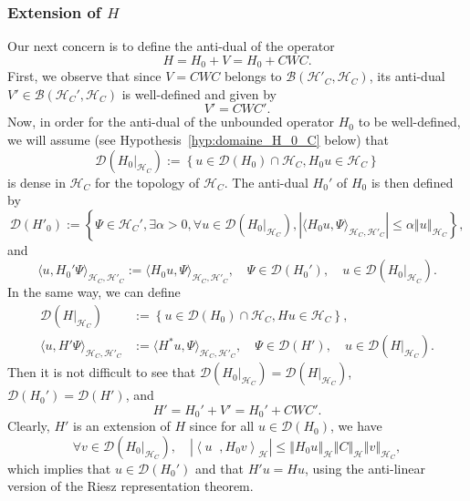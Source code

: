 \documentclass[10pt]{amsart}
\theoremstyle{definition}\newtheorem{defi}[theo]{Definition}\newtheorem{rema}[theo]{Remark}\newtheorem{exam}[theo]{Example}\newtheorem{exem}[theo]{Example}\newtheorem{nota}[theo]{Notation}
\newcommand{\Hi}{\mathcal{H}}
\newcommand{\norme}[1]{\left\Vert #1\right\Vert}
\newcommand{\scal}[2]{\left\langle{#1} \middle., {#2}\right\rangle}
\newcommand{\abso}[1]{\left|{#1}\right|}
\newcommand{\clB}{\mathcal{B}}
\newcommand{\clD}{\mathcal{D}}
\let\oldexists\exists
\renewcommand*{\exists}{\mathrel{\oldexists}}
\let\oldforall\forall
\renewcommand*{\forall}{\mathrel{\oldforall}}
\begin{document}
\subsubsection{Extension of \texorpdfstring{$H$}{H}}
Our next concern is to define the anti-dual of the operator
\begin{equation*}
H=H_0+V=H_0+CWC.
\end{equation*}
First, we observe that since $V=CW C$ belongs to $\clB(\Hi'_C,\Hi_C)$, its anti-dual $V'\in\clB(\Hi_C',\Hi_C)$ is well-defined and given by
\begin{equation*}
V'=CW C'.
\end{equation*}
Now, in order for the anti-dual of the unbounded operator $H_0$ to be well-defined, we will assume (see Hypothesis~\ref{hyp:domaine_H_0_C} below) that
\begin{equation*}
\clD({H_0}|_{\Hi_C}):=\left\lbrace u\in\clD(H_0)\cap\Hi_C, H_0u\in\Hi_C\right\rbrace
\end{equation*}
is dense in $\Hi_C$ for the topology of $\Hi_C$. The anti-dual $H_0'$ of $H_0$ is then defined by
\begin{equation*}
\clD(H'_0):=\left\lbrace \Psi\in\Hi_C',\exists \alpha>0,\forall u\in\clD\left({H_0}|_{\Hi_C}\right),\left|\langle H_0u,\Psi\rangle_{\Hi_C,\Hi'_C}\right|\leq\alpha\norme{u}_{\Hi_C}\right\rbrace,
\end{equation*}
and
\begin{equation*}
\langle u,H_0'\Psi\rangle_{\Hi_C,\Hi'_C}:=\langle H_0u,\Psi\rangle_{\Hi_C,\Hi'_C}, \quad \Psi\in\clD(H_0'), \quad u\in\clD({H_0}|_{\Hi_C}).
\end{equation*}
In the same way, we can define
\begin{align*}
\clD(H|_{\Hi_C}) &{:=}\left\lbrace u\in\clD(H_0)\cap\Hi_C,Hu\in\Hi_C\right\rbrace,
\\
\langle u,H'\Psi \rangle_{\Hi_C,\Hi'_C} &{:=}\langle H^*u,\Psi\rangle_{\Hi_C,\Hi'_C}, \quad \Psi\in\clD(H'), \quad u\in\clD({H}|_{\Hi_C}).
\end{align*}
Then it is not difficult to see that $\clD({H_0}|_{\Hi_C})=\clD(H|_{\Hi_C})$, $\clD(H_0')=\clD(H')$, and
\begin{equation*}
H'=H_0'+V'=H_0'+CW C'.
\end{equation*}
Clearly, $H'$ is an extension of $H$ since for all $u\in\clD(H_0)$, we have
\begin{equation*}
\forall v\in\clD({H_0}|_{\Hi_C}), \quad \abso{\scal{u}{H_0v}_\Hi}\leq\norme{H_0u}_{\Hi}\norme{C}_\Hi\norme{v}_{\Hi_C},
\end{equation*}
which implies that $u\in\clD(H_0')$ and that $H'u=Hu$, using the anti-linear version of the Riesz representation theorem.
\end{document}
